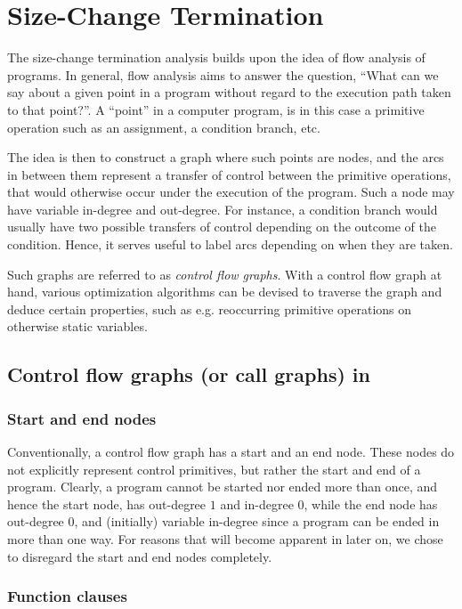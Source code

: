 \chapter{Size-Change Termination}

The size-change termination analysis builds upon the idea of flow analysis of
programs. In general, flow analysis aims to answer the question, ``What can we
say about a given point in a program without regard to the execution path taken
to that point?''. A ``point'' in a computer program, is in this case a primitive
operation such as an assignment, a condition branch, etc.

The idea is then to construct a graph where such points are nodes, and the arcs
in between them represent a transfer of control between the primitive
operations, that would otherwise occur under the execution of the program.
Such a node may have variable in-degree and out-degree. For instance, a
condition branch would usually have two possible transfers of control depending
on the outcome of the condition. Hence, it serves useful to label arcs
depending on when they are taken.

Such graphs are referred to as \emph{control flow graphs}. With a control flow
graph at hand, various optimization algorithms can be devised to traverse the
graph and deduce certain properties, such as e.g.  reoccurring primitive
operations on otherwise static variables\cite{kildall}.

\section{Control flow graphs (or call graphs) in \D{}}

\subsection{Start and end nodes}

Conventionally, a control flow graph has a start and an end node. These nodes
do not explicitly represent control primitives, but rather the start and end of
a program. Clearly, a program cannot be started nor ended more than once, and
hence the start node, has out-degree $1$ and in-degree $0$, while the end node
has out-degree $0$, and (initially) variable in-degree since a program can be
ended in more than one way. For reasons that will become apparent in later on,
we chose to disregard the start and end nodes completely.

\subsection{Function clauses}


